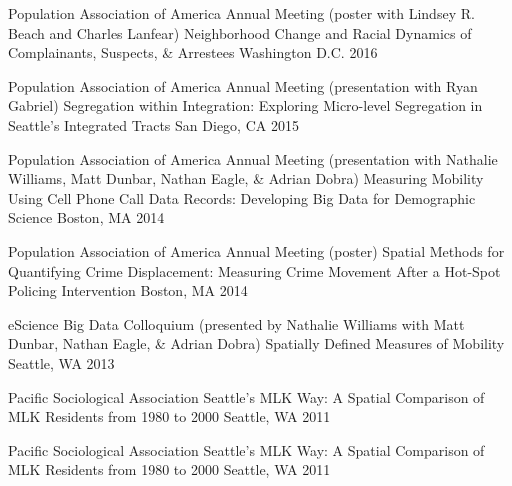 \begin{cventries}
  \cventry
    {Population Association of America Annual Meeting (poster with Lindsey R. Beach and Charles Lanfear)} %
    {Neighborhood Change and Racial Dynamics of Complainants, Suspects, \& Arrestees} %
    {Washington D.C.} %
    {2016} %
    {}

  \cventry
    {Population Association of America Annual Meeting (presentation with Ryan Gabriel)} %
    {Segregation within Integration: Exploring Micro-level Segregation in Seattle's Integrated Tracts} %
    {San Diego, CA} %
    {2015} %
    {}

  \cventry
    {Population Association of America Annual Meeting (presentation with Nathalie Williams, Matt Dunbar, Nathan Eagle, \& Adrian Dobra)} %
    {Measuring Mobility Using Cell Phone Call Data Records: Developing Big Data for Demographic Science} %
    {Boston, MA} %
    {2014} %
    {}

  \cventry
    {Population Association of America Annual Meeting (poster)} %
    {Spatial Methods for Quantifying Crime Displacement: Measuring Crime Movement After a Hot-Spot Policing Intervention} %
    {Boston, MA} %
    {2014} %
    {}

  \cventry
    {eScience Big Data Colloquium (presented by Nathalie Williams with Matt Dunbar, Nathan Eagle, \& Adrian Dobra)} %
    {Spatially Defined Measures of Mobility} %
    {Seattle, WA} %
    {2013} %
    {}

  \cventry
    {Pacific Sociological Association} %
    {Seattle's MLK Way: A Spatial Comparison of MLK Residents from 1980 to 2000} %
    {Seattle, WA} %
    {2011} %
    {}

  \cventry
    {Pacific Sociological Association} %
    {Seattle's MLK Way: A Spatial Comparison of MLK Residents from 1980 to 2000} %
    {Seattle, WA} %
    {2011} %
    {}

\end{cventries}
